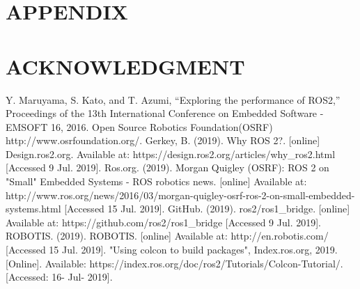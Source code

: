 \documentclass[letterpaper, 10 pt, conference]{ieeeconf}  %
\begin{document}
\section*{APPENDIX}

\section*{ACKNOWLEDGMENT}
\begin{thebibliography}{99}

 Y. Maruyama, S. Kato, and T. Azumi, “Exploring the performance of ROS2,” Proceedings of the 13th International Conference on Embedded Software - EMSOFT 16, 2016. 
 Open Source Robotics Foundation(OSRF) http://www.osrfoundation.org/.
 Gerkey, B. (2019). Why ROS 2?. [online] Design.ros2.org. Available at: https://design.ros2.org/articles/why\_ros2.html [Accessed 9 Jul. 2019].
Ros.org. (2019). Morgan Quigley (OSRF): ROS 2 on "Small" Embedded Systems - ROS robotics news. [online] Available at: http://www.ros.org/news/2016/03/morgan-quigley-osrf-ros-2-on-small-embedded-systems.html [Accessed 15 Jul. 2019].
 GitHub. (2019). ros2/ros1\_bridge. [online] Available at: https://github.com/ros2/ros1\_bridge [Accessed 9 Jul. 2019].
 ROBOTIS. (2019). ROBOTIS. [online] Available at: http://en.robotis.com/ [Accessed 15 Jul. 2019].
 "Using colcon to build packages", Index.ros.org, 2019. [Online]. Available: https://index.ros.org/doc/ros2/Tutorials/Colcon-Tutorial/. [Accessed: 16- Jul- 2019].
\end{thebibliography}
\end{document}
